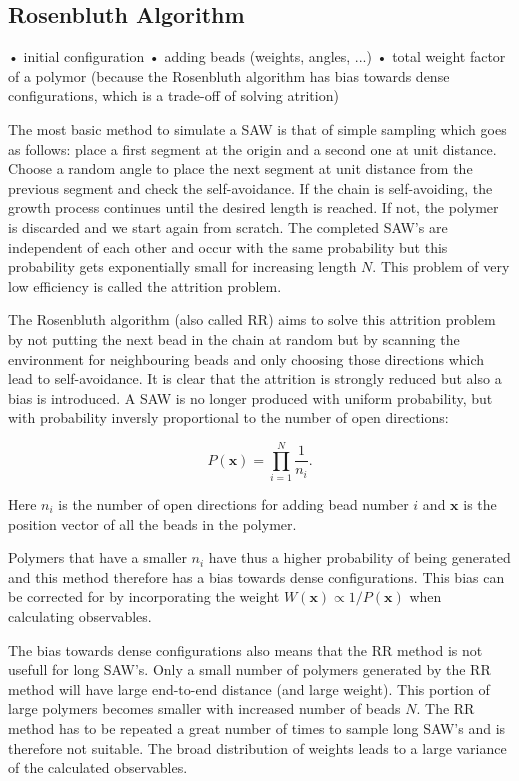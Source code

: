 \subsection*{Rosenbluth Algorithm}
		• initial configuration
		• adding beads (weights, angles, ...)
		• total weight factor of a polymor (because the Rosenbluth algorithm has bias towards dense configurations, which is a trade-off of solving atrition)

The most basic method to simulate a SAW is that of simple sampling which goes as follows: place a first segment at the origin and a second one at unit distance. Choose a random angle to place the next segment at unit distance from the previous segment and check the self-avoidance. If the chain is self-avoiding, the growth process continues until the desired length is reached. If not, the polymer is discarded and we start again from scratch. The completed SAW's are independent of each other and occur with the same probability but this probability gets exponentially small for increasing length $N$. This problem of very low efficiency is called the attrition problem.

The Rosenbluth algorithm (also called RR) aims to solve this attrition problem by not putting the next bead in the chain at random but by scanning the environment for neighbouring beads and only choosing those directions which lead to self-avoidance. It is clear that the attrition is strongly reduced but also a bias is introduced. A SAW is no longer produced with uniform probability, but with probability inversly proportional to the number of open directions:

\begin{equation} \label{eq:prob_RR}
	P\left(\mathbf{x}\right) = \prod_{i=1}^{N} \frac{1}{n_i} .
\end{equation}

Here $n_i$ is the number of open directions for adding bead number $i$ and $\mathbf{x}$ is the position vector of all the beads in the polymer.

Polymers that have a smaller $n_i$ have thus a higher probability of being generated and this method therefore has a bias towards dense configurations. This bias can be corrected for by incorporating the weight $W\left( \mathbf{x} \right) \propto 1/ P\left( \mathbf{x} \right)$ when calculating observables.

The bias towards dense configurations also means that the RR method is not usefull for long SAW's. Only a small number of polymers generated by the RR method will have large end-to-end distance (and large weight). This portion of large polymers becomes smaller with increased number of beads $N$. The RR method has to be repeated a great number of times to sample long SAW's and is therefore not suitable. The broad distribution of weights leads to a large variance of the calculated observables.

